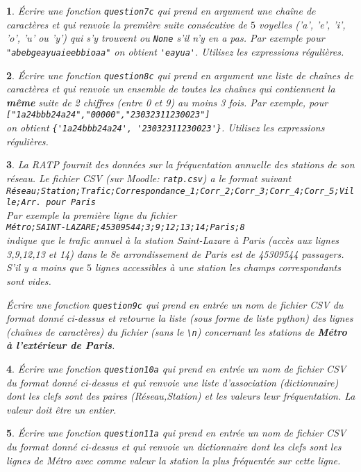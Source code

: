 \documentclass[10pt]{article}
\newtheorem{exi}{}
\newenvironment{exo}{\begin{exi}\em}{\end{exi}}
\begin{document}
\vspace*{-2ex}
\begin{exo}Écrire une fonction {\tt question7c}
qui prend en argument une chaîne de caractères et qui renvoie
la première suite consécutive de $5$ voyelles ('a', 'e', 'i', 'o', 'u' ou 'y')
qui s'y trouvent ou \verb+None+
s'il n'y en a pas.
Par exemple pour \verb+"abebgeayuaieebbioaa"+ on obtient
\verb+'eayua'+. Utilisez les expressions régulières.
\end{exo}
\vspace*{-2ex}
\begin{exo}Écrire une fonction {\tt question8c} qui prend en argument une liste
de chaînes de caractères et qui renvoie un ensemble de toutes les chaînes
qui contiennent la {\bf même} suite de 2
chiffres (entre 0 et 9) au moins 3 fois.
Par exemple, pour \verb+["1a24bbb24a24","00000","23032311230023"]+\\
on obtient \verb+{'1a24bbb24a24', '23032311230023'}+.
Utilisez les expressions régulières.
\end{exo}
\vspace*{-2ex}
\begin{exo}La RATP fournit des données sur la fréquentation annuelle des stations de son réseau. Le fichier CSV (sur Moodle: \verb+ratp.csv+) a le format suivant\\
\verb+Réseau;Station;Trafic;Correspondance_1;Corr_2;Corr_3;Corr_4;Corr_5;Ville;Arr. pour Paris+\\
Par exemple la première ligne du fichier\\
\verb+Métro;SAINT-LAZARE;45309544;3;9;12;13;14;Paris;8+\\
indique que le trafic annuel à la station Saint-Lazare à Paris (accès aux lignes 3,9,12,13 et 14) dans le 8e arrondissement de Paris est de 45309544 passagers. S'il y a moins que $5$ lignes accessibles à une station les champs correspondants sont vides. 

Écrire une fonction {\tt question9c} qui prend en entrée un nom de fichier CSV
du format donné ci-dessus
et retourne la liste (sous forme de liste python) des lignes (chaînes
de caractères) du fichier (sans le \verb+\n+)
concernant les stations de {\bf Métro à l'extérieur de Paris}.
\end{exo}
\vspace*{-2ex}
\begin{exo}Écrire une fonction {\tt question10a} qui prend en entrée un nom de fichier CSV
du format donné ci-dessus
et qui renvoie une liste d'association (dictionnaire) dont les clefs sont
des paires (Réseau,Station) et les valeurs leur fréquentation.
La valeur doit être un entier.
\end{exo}
\vspace*{-2ex}
\begin{exo}Écrire une fonction {\tt question11a} qui prend en entrée un nom de fichier CSV
du format donné ci-dessus et qui renvoie un dictionnaire dont les clefs sont
les lignes de Métro
avec comme valeur la station la plus fréquentée sur cette ligne.
\end{exo}
\vspace*{-2ex}
\end{document}
